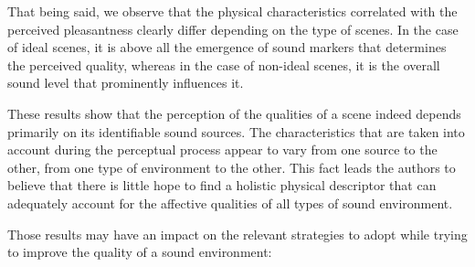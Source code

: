 \documentclass[12pt]{elsarticle}
\newcommand{\ie}{\emph{i.\,e.}}
\providecommand{\DIFaddbegin}{} %
\providecommand{\DIFaddend}{} %
\begin{document}

That being said, we observe that the physical characteristics correlated with the perceived pleasantness clearly differ depending on the type of scenes. In the case of ideal scenes, it is above all the emergence of sound markers that determines the perceived quality, whereas in the case of non-ideal scenes, it is the overall sound level that prominently influences it.


These results show that the perception of the qualities of a scene indeed depends primarily on its identifiable sound sources. The characteristics that are taken into account during the perceptual process appear to vary from one source to the other, from one type of environment to the other. This fact leads the authors to believe that there is little hope to find a holistic physical descriptor that can adequately account for the affective qualities of all types of sound environment.

\DIFaddbegin 

\DIFaddend %

Those results may have an impact on the relevant strategies to adopt while trying to improve the quality of a sound environment:

\end{document}
